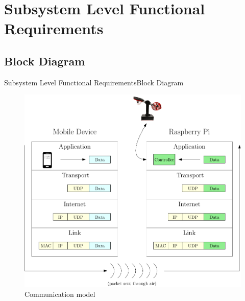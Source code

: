 \documentclass{beamer}
\begin{document}
  


\section{Subsystem Level Functional Requirements}



\subsection{Block Diagram}

\begin{frame}{Subsystem Level Functional Requirements}{Block Diagram}

\begin{figure}
  \centering
  \includegraphics[scale=0.31]{figs/ipe/TCPModel}
  \caption{Communication model}
  \label{fig:TCPModel}
\end{figure}

\end{frame}
\end{document}
